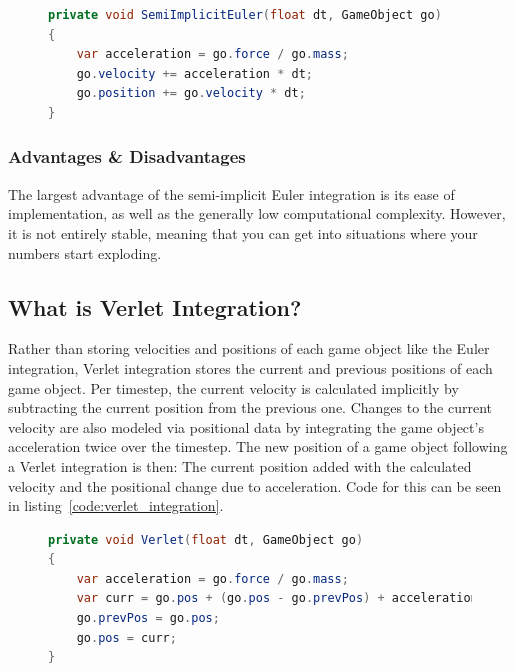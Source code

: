 \begin{figure}
\begin{lstlisting}[label={code:semi-implicit_euler_integration},language=csharp,caption={Semi-Implicit Euler Integration}]
private void SemiImplicitEuler(float dt, GameObject go)
{
    var acceleration = go.force / go.mass;
    go.velocity += acceleration * dt;
    go.position += go.velocity * dt;
}
\end{lstlisting}
\end{figure}

\subsubsection{Advantages \& Disadvantages}
The largest advantage of the semi-implicit Euler integration is its ease of implementation, as well as the generally low computational complexity.
However, it is not entirely stable, meaning that you can get into situations where your numbers start exploding.

\subsection{What is Verlet Integration?}
Rather than storing velocities and positions of each game object like the Euler integration, Verlet integration stores the current and previous positions of each game object.
Per timestep, the current velocity is calculated implicitly by subtracting the current position from the previous one.
Changes to the current velocity are also modeled via positional data by integrating the game object's acceleration twice over the timestep.
The new position of a game object following a Verlet integration is then: The current position added with the calculated velocity and the positional change due to acceleration.
Code for this can be seen in listing~\ref{code:verlet_integration}.

\begin{figure}
\begin{lstlisting}[label={code:verlet_integration},language=csharp,caption={Verlet Integration}]
private void Verlet(float dt, GameObject go)
{
    var acceleration = go.force / go.mass;
    var curr = go.pos + (go.pos - go.prevPos) + acceleration * dt * dt;
    go.prevPos = go.pos;
    go.pos = curr;
}
\end{lstlisting}
\end{figure}

